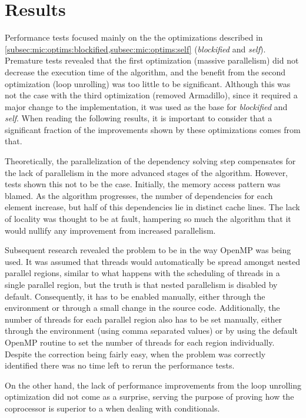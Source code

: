 \documentclass[../thesis]{subfiles}
\begin{document}
	\section{Results}
	\label{sec:mic:results}

	Performance tests focused mainly on the the optimizations described in \cref{subsec:mic:optims:blockified,subsec:mic:optims:self} (\emph{blockified} and \emph{self}). Premature tests revealed that the first optimization (massive parallelism) did not decrease the execution time of the algorithm, and the benefit from the second optimization (loop unrolling) was too little to be significant. Although this was not the case with the third optimization (removed Armadillo), since it required a major change to the implementation, it was used as the base for \emph{blockified} and \emph{self}. When reading the following results, it is important to consider that a significant fraction of the improvements shown by these optimizations comes from that.

	Theoretically, the parallelization of the dependency solving step compensates for the lack of parallelism in the more advanced stages of the algorithm. However, tests shown this not to be the case. Initially, the memory access pattern was blamed. As the algorithm progresses, the number of dependencies for each element increase, but half of this dependencies lie in distinct cache lines. The lack of locality was thought to be at fault, hampering so much the algorithm that it would nullify any improvement from increased parallelism.

	Subsequent research \cite{PRACE:MIC:BestPracticeGuide} revealed the problem to be in the way OpenMP was being used. It was assumed that threads would automatically be spread amongst nested parallel regions, similar to what happens with the scheduling of threads in a single parallel region, but the truth is that nested parallelism is disabled by default. Consequently, it has to be enabled manually, either through the environment or through a small change in the source code. Additionally, the number of threads for each parallel region also has to be set manually, either through the environment (using comma separated values) or by using the default OpenMP routine to set the number of threads for each region individually. Despite the correction being fairly easy, when the problem was correctly identified there was no time left to rerun the performance tests.

	On the other hand, the lack of performance improvements from the loop unrolling optimization did not come as a surprise, serving the purpose of proving how the \intel\xeonphi coprocessor is superior to a \gpu when dealing with conditionals.
\end{document}
